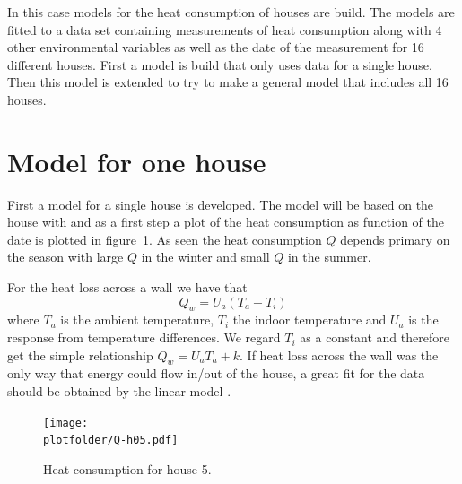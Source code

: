 \def\assignmenttitle{Energy consumption}
\def\assignmentdate{24-10-2011}
\def\coursetitle{02418 Statistical modelling}
\def\plotfolder{../plots}





\maketitle

In this case models for the heat consumption of houses are build. The models are fitted to a data set containing measurements of heat consumption along with 4 other environmental variables as well as the date of the measurement for 16 different houses. First a model is build that only uses data for a single house. Then this model is extended to try to make a general model that includes all 16 houses.

\section*{Model for one house}
First a model for a single house is developed. The model will be based on the house with  and as a first step a plot of the heat consumption as function of the date is plotted in figure~\ref{fig:Q-house-5}. As seen the heat consumption $Q$ depends primary on the season with large $Q$ in the winter and small $Q$ in the summer. \par
For the heat loss across a wall we have that 
\begin{equation*}
    Q_w = U_a(T_a - T_i)
\end{equation*}
where $T_a$ is the ambient temperature, $T_i$ the indoor temperature and $U_a$ is the response from temperature differences. We regard $T_i$ as a constant and therefore get the simple relationship $Q_w = U_aT_a + k$. If heat loss across the wall was the only way that energy could flow in/out of the house, a great fit for the data should be obtained by the linear model .
\begin{figure}[ht]
\centering
\texttt{[image: \\plotfolder/Q-h05.pdf]}
\caption{Heat consumption for house 5.}
\label{fig:Q-house-5}
\end{figure}

